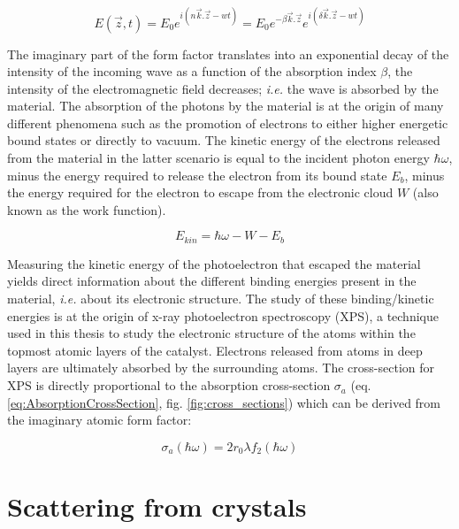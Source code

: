 \begin{equation}
    E(\vec{z}, t) = E_0 e^{i(n\vec{k}.\vec{z} - wt)} = E_0 e^{-\beta \vec{k}.\vec{z}} e^{i(\delta\vec{k}.\vec{z} - wt)}
\end{equation}

The imaginary part of the form factor translates into an exponential decay of the intensity of the incoming wave as a function of the absorption index $\beta$, the intensity of the electromagnetic field decreases; \textit{i.e.} the wave is absorbed by the material.
The absorption of the photons by the material is at the origin of many different phenomena such as the promotion of electrons to either higher energetic bound states or directly to vacuum.
The kinetic energy of the electrons released from the material in the latter scenario is equal to the incident photon energy $\hbar\omega$, minus the energy required to release the electron from its bound state $E_b$, minus the energy required for the electron to escape from the electronic cloud $W$ (also known as the work function).

\begin{equation}
    E_{kin} = \hbar\omega - W - E_b
\end{equation}

Measuring the kinetic energy of the photoelectron that escaped the material yields direct information about the different binding energies present in the material, \textit{i.e.} about its electronic structure.
The study of these binding/kinetic energies is at the origin of x-ray photoelectron spectroscopy (XPS), a technique used in this thesis to study the electronic structure of the atoms within the topmost atomic layers of the catalyst.
Electrons released from atoms in deep layers are ultimately absorbed by the surrounding atoms.
The cross-section for XPS is directly proportional to the absorption cross-section $\sigma_a$ (eq. \ref{eq:AbsorptionCrossSection}, fig. \ref{fig:cross_sections}) which can be derived from the imaginary atomic form factor:

\begin{equation}
    \label{eq:AbsorptionCrossSection}
    \sigma_a(\hbar\omega) = 2 r_0 \lambda f_2(\hbar\omega)
\end{equation}

\section{Scattering from crystals}\label{sec:ScatCrystal}

